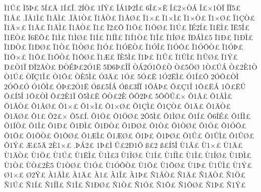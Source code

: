 {^^cc1^^da^^a3
^^cc5^^de^^a3
5^^cd^^a3^^c4
1^^cd^^a3^^ce.
2^^cd^^d2^^a3
1^^cd^^dd^^a3
^^ce^^c11^^de2^^ce^^a3
6^^ce^^a3^^d7^^cb
^^ce^^a32^^d7^^d2^^c1
^^ce^^a3^^d71^^d2^^cf
^^ce^^cf5^^a3
^^cf1^^c2^^a3
.^^cf^^c21^^cc^^a3
^^cf1^^c2^^cc^^a3
.^^cf^^c21^^d2^^a3
^^cf1^^c2^^d2^^a3
^^cf1^^c2^^d8^^a3
^^cf1^^d7^^a3
^^cf1^^d7^^cc^^a3
^^cf1^^d7^^d2^^a3
^^cf1^^d7^^d8^^a3
^^cf1^^c7^^d2^^a3
^^cf1^^c4^^d7^^a3
^^cf1^^c4^^a3
^^cf1^^c4^^cc^^a3
^^cf1^^c4^^d2^^a3
^^cf1^^a3
^^cf2^^a3^^d4
^^cf1^^d6^^a3
^^cf1^^d6^^d8^^a3
^^cf1^^da^^a3
^^cf^^c92^^cd^^a3
^^cf1^^cb^^cc^^a3
^^cf^^cb5^^ce^^a3
^^cf1^^cb^^d2^^a3
^^cf6^^cb^^d5^^a3
^^cf1^^cc^^a3
^^cf1^^cc^^d8^^a3
^^cf1^^cd^^a3
^^cf1^^cd^^cc^^a3
^^cf1^^cd1^^d2^^a3
^^cf1^^ce^^a3
^^cf1^^ce^^d8^^a3
^^cf^^d0^^c1^^cc^^a35
^^cf1^^d0^^a3
^^cf1^^d0^^cc^^a3
^^cf1^^d0^^d2^^a3
^^cf1^^d0^^d8^^a3
^^cf1^^d2^^a3
^^cf1^^d2^^d8^^a3
^^cf1^^d3^^a3
^^cf1^^d3^^cb^^d2^^a3
^^cf1^^d3^^ce^^a3
^^cf1^^d3^^d4^^a3
^^cf1^^d3^^d4^^d2^^a3
^^cf1^^d3^^de^^a3
^^cf1^^d4^^d7^^a3
^^cf1^^d4^^a3
^^cf1^^d4^^d2^^a3
^^cf1^^d4^^d8^^a3
^^cf1^^c6^^a3
^^cf^^c85^^cc^^a3
^^cf1^^de^^a3
^^cf1^^db^^a3
^^cf1^^db^^cc^^a3
^^cf1^^db^^d8^^a3
^^cf1^^dd^^a3
^^d0^^a3^^d21^^cf
^^d0^^cf2^^c4^^d2^^a3
^^d0^^d2^^c9^^de^^a32^^d31^^cb
5^^d06^^de^^a3^^ce^^ce
^^d2^^c12^^d31^^d4^^a3^^d2
^^d2^^a35^^d6^^d8
1^^d2^^a3^^da^^c1
^^d2^^a32^^c81^^d2
^^d21^^da^^a3
^^d2^^cf^^c71^^ce^^a3
^^d21^^d4^^a3
^^d2^^c85^^cc^^a3
^^d33^^c4^^a3
1^^d3^^a3
5^^d3^^a3^^cb
1^^d32^^cb^^cc^^a3
^^d31^^cd^^a3^^d4
2^^d3^^d4^^a3^^d2^^cc
2^^d3^^d4^^a3^^d3
^^d31^^d4^^cc^^a3
^^d3^^de^^a32^^d31^^cb
^^d3^^df^^a35^^cd^^c1
^^d3^^df^^a33^^cd^^cf
1^^d4^^c5^^de^^a3
^^d4^^a3^^c71^^ce
1^^d4^^a3^^cb^^c1
1^^d4^^a3^^cb^^db
^^d4^^a3^^cd5^^ce
1^^d4^^a3^^d2^^cc
^^d4^^a32^^c81^^cf
^^d45^^cc^^a3^^ca
^^d4^^d2^^a32^^c8
^^d4^^d52^^de^^a3
5^^d4^^d5^^db^^a3^^d7
^^d51^^c2^^a3
^^d51^^c2^^cc^^a3
^^d51^^c2^^d2^^a3
^^d51^^c2^^d8^^a3
^^d51^^d7^^a3
^^d51^^d7^^cc^^a3
^^d51^^d7^^d8^^a3
^^d51^^c7^^cc^^a3
^^d51^^c7^^d2^^a3
^^d51^^c4^^a3
^^d51^^c4^^d2^^a3
^^d51^^c4^^d8^^a3
^^d51^^a3
^^d52^^a3^^d7
^^d55^^a3^^cd.
^^d51^^d6^^a3
^^d51^^d6^^d8^^a3
2^^d55^^cc^^a3
^^d51^^cc^^d8^^a3
^^d51^^cd^^a3
^^d56^^cd^^c9^^a3
^^d51^^cd^^cc^^a3
^^d51^^cd^^d2^^a3
^^d51^^ce^^a3
^^d51^^d0^^a3
^^d51^^d0^^cc^^a3
^^d51^^d0^^d2^^a3
^^d51^^d0^^d8^^a3
^^d51^^d2^^a3
^^d51^^d2^^d8^^a3
^^d51^^d3^^a3
^^d51^^d3^^d4^^a3
^^d51^^d4^^a3
^^d51^^d4^^d2^^a3
^^d51^^d4^^d8^^a3
^^d51^^c6^^cc^^a3
^^d51^^c6^^d8^^a3
^^d51^^de^^a3
^^d51^^de^^d8^^a3
^^d51^^db^^a3
^^d51^^db^^cc^^a3
^^d51^^db^^d8^^a3
^^d51^^dd^^a3
^^c6^^a35^^c4
2^^c81^^d7^^a3
.^^de^^c12^^a3
1^^de^^a3^^cc
^^db^^a32^^d01^^d4
^^df^^a32
^^df^^a3^^cd5^^ce
^^d91^^c2^^a3
^^d91^^d7^^a3
^^d91^^c4^^a3
^^d91^^c4^^d2^^a3
^^d91^^d6^^a3
^^d91^^da^^a3
^^d91^^cb^^cc^^a3
^^d91^^cc^^a33
^^d91^^cc^^d8^^a3
^^d91^^cd^^a3
^^d91^^cd^^cc^^a3
^^d91^^ce^^a3
^^d91^^ce^^d8^^a3
^^d91^^d0^^cc^^a3
^^d91^^d2^^a3
^^d9^^d2^^a32^^c85
^^d91^^d2^^d8^^a3
^^d91^^d3^^a3
^^d91^^d3^^d4^^d2^^a3
^^d91^^d4^^a3
^^d91^^d4^^d8^^a3
^^d91^^de^^a3
^^d91^^db^^cc^^a3
^^d91^^dd^^a3
^^d81^^d7^^a3
^^d82^^dd^^a3
^^c01^^c2^^cc^^a3
^^c01^^c4^^a3
^^c01^^a3
^^c01^^ce^^a3
^^c01^^de^^a3
^^d11^^c2^^d2^^a3
^^d11^^c4^^a3
^^d11^^c4^^d2^^a3
^^d11^^d6^^a3
^^d11^^da^^a3
^^d11^^cd^^a3
^^d11^^cd^^cc^^a3
^^d11^^ce^^a3
^^d11^^d0^^d8^^a3
^^d11^^d2^^a3
^^d11^^d3^^a3
^^d11^^d4^^a3
^^d11^^d4^^d8^^a3
^^d11^^de^^a3
^^d11^^dd^^a3
}
